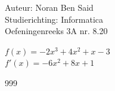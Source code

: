 \documentclass[a4paper]{article}
\begin{document}
  
\noindent \large Auteur: Noran Ben Said \\
\noindent \large Studierichting: Informatica\\
\noindent \large Oefeningenreeks 3A nr. 8.20\\

\medskip

\normalsize

$f(x) = -2x^3+4x^2+x-3$\\

$f'(x) = -6x^2+8x+1$\\


\begin{thebibliography}{999}
\end{thebibliography}
\end{document}
